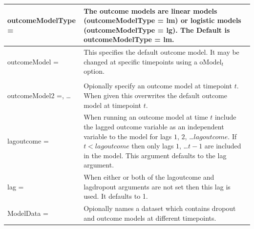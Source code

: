 \documentclass[10pt]{article}
\begin{document}
\begin{minipage}[t]{6.2in}
\begin{flushleft}
\begin{spacing}{1.1}
\begin{tabular}[l]{|p{1.3in}|p{4.6in}|}
   outcomeModelType = & The outcome models are linear models (outcomeModelType = lm) or logistic models (outcomeModelType = lg).  The Default is outcomeModelType = lm.
\\\hline
   outcomeModel =    &  This specifies the default outcome model. It may be changed at specific timepoints using a oModel$_t$ option.  
\\\hline
   \begin{minipage}[t]{1.3in}
   outcomeModel1 =,\\
   outcomeModel2 =, \ldots
   \end{minipage}    &  Opionally specify an outcome model at timepoint $t$.  When given this overwrites the default outcome model at timepoint $t$.  
\\\hline
   lagoutcome =      &  When running an outcome model at time $t$ include the lagged outcome variable as an independent variable to the model for lags $1$, $2$, \ldots $lagoutcome$.  If $t < lagoutcome$ then only lags $1$, \ldots $t-1$ are included in the model.  This argument defaults to the lag argument.
\\\hline
   lag =             &  When either or both of the lagoutcome and lagdropout arguments are not set then this lag is used.  It defaults to 1.
\\\hline
   ModelData =       &  Opionally names a dataset which contains dropout and outcome models at different timepoints. 
\\\hline
\end{tabular}
\end{spacing}
\end{flushleft}
\end{minipage}
\end{document}
